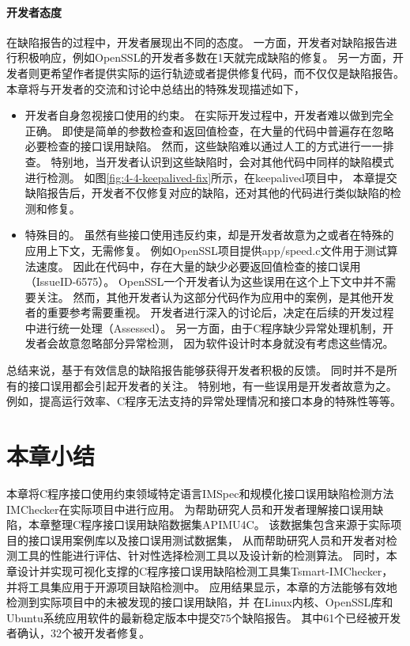 \paragraph{开发者态度}
在缺陷报告的过程中，开发者展现出不同的态度。
一方面，开发者对缺陷报告进行积极响应，例如OpenSSL的开发者多数在1天就完成缺陷的修复。
另一方面，开发者则更希望作者提供实际的运行轨迹或者提供修复代码，而不仅仅是缺陷报告。
本章将与开发者的交流和讨论中总结出的特殊发现描述如下，
\begin{itemize}
	\item 开发者自身忽视接口使用的约束。
	在实际开发过程中，开发者难以做到完全正确。
	即使是简单的参数检查和返回值检查，在大量的代码中普遍存在忽略必要检查的接口误用缺陷。
	然而，这些缺陷难以通过人工的方式进行一一排查。
	特别地，当开发者认识到这些缺陷时，会对其他代码中同样的缺陷模式进行检测。
	如图\ref{fig:4-4-keepalived-fix}所示，在keepalived项目中，
	本章提交缺陷报告后，开发者不仅修复对应的缺陷，还对其他的代码进行类似缺陷的检测和修复。
	\item 特殊目的。
	虽然有些接口使用违反约束，却是开发者故意为之或者在特殊的应用上下文，无需修复。
	例如OpenSSL项目提供app/speed.c文件用于测试算法速度。
	因此在代码中，存在大量的缺少必要返回值检查的接口误用（IssueID-6575）。
	OpenSSL一个开发者认为这些误用在这个上下文中并不需要关注。
	然而，其他开发者认为这部分代码作为应用中的案例，是其他开发者的重要参考需要重视。
	开发者进行深入的讨论后，决定在后续的开发过程中进行统一处理（Assessed）。
	另一方面，由于C程序缺少异常处理机制，开发者会故意忽略部分异常检测，
	因为软件设计时本身就没有考虑这些情况。
\end{itemize}

总结来说，基于有效信息的缺陷报告能够获得开发者积极的反馈。
同时并不是所有的接口误用都会引起开发者的关注。
特别地，有一些误用是开发者故意为之。
例如，提高运行效率、C程序无法支持的异常处理情况和接口本身的特殊性等等。


\section{本章小结}
\label{sec:4.5}
本章将C程序接口使用约束领域特定语言IMSpec和规模化接口误用缺陷检测方法IMChecker在实际项目中进行应用。
为帮助研究人员和开发者理解接口误用缺陷，本章整理C程序接口误用缺陷数据集APIMU4C。
该数据集包含来源于实际项目的接口误用案例库以及接口误用测试数据集，
从而帮助研究人员和开发者对检测工具的性能进行评估、针对性选择检测工具以及设计新的检测算法。
同时，本章设计并实现可视化支撑的C程序接口误用缺陷检测工具集Tsmart-IMChecker，
并将工具集应用于开源项目缺陷检测中。
应用结果显示，本章的方法能够有效地检测到实际项目中的未被发现的接口误用缺陷，并
在Linux内核、OpenSSL库和Ubuntu系统应用软件的最新稳定版本中提交75个缺陷报告。
其中61个已经被开发者确认，32个被开发者修复。